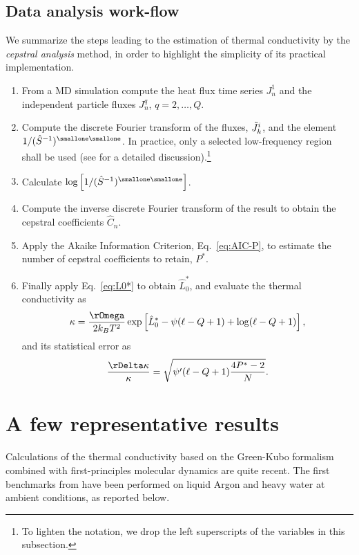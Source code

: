 \subsection{Data analysis work-flow}
We summarize the steps leading to the estimation of thermal conductivity by the \textit{cepstral analysis} method, in order to highlight the simplicity of its practical implementation.
\begin{enumerate}
\item From a MD simulation compute the heat flux time series $J_n^1$ and the independent particle fluxes $J_n^q$, $q=2,\dots,Q$.
\item Compute the discrete Fourier transform of the fluxes, $\tilde{J}^{\small i}_k$, and the element $1/(\hat{S}^{-1})^{\smallone\smallone}$. In practice, only a selected low-frequency region shall be used (see \cite{Ercole2017} for a detailed discussion).\footnote{To lighten the notation, we drop the left superscripts of the variables in this subsection.}
\item Calculate $\log\left[1/(\hat{S}^{-1})^{\smallone\smallone}\right]$.
\item Compute the inverse discrete Fourier transform of the result to obtain the cepstral coefficients $\hat{C}_n$.
\item Apply the Akaike Information Criterion, Eq.~\eqref{eq:AIC-P}, to estimate the number of cepstral coefficients to retain, $P^*$.
\item Finally apply Eq.~\eqref{eq:L0*} to obtain $\hat{L}_0^*$, and evaluate the thermal conductivity as
\begin{equation}
\kappa = \frac{\rOmega}{2k_B T^2} \exp\left[\hat{L}_0^* - \psi(\ell - Q+1) + \log(\ell -Q+1) \right],
\end{equation}
and its statistical error as
\begin{equation}
\frac{\rDelta\kappa}{\kappa} = \sqrt{\psi'(\ell -Q+1) \frac{4P^{*}-2}{N}}.
\end{equation}
\end{enumerate}


\section{A few representative results}
Calculations of the thermal conductivity based on the Green-Kubo formalism combined with first-principles molecular dynamics are quite recent. The first benchmarks from \cite{Marcolongo2016} have been performed on liquid Argon and heavy water at ambient conditions, as reported below.


